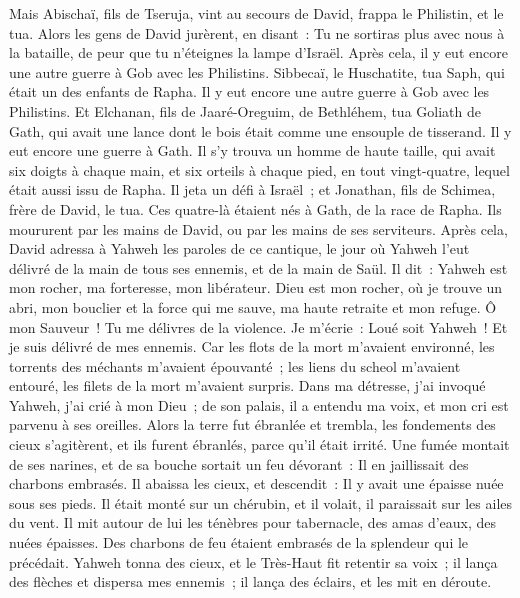 \begin{multicols}{2}
Mais Abischaï, fils de Tseruja, vint au secours de David, frappa le Philistin, et le tua. Alors les gens de David jurèrent, en disant~: Tu ne sortiras plus avec nous à la bataille, de peur que tu n'éteignes la lampe d'Israël.
Après cela, il y eut encore une autre guerre à Gob avec les Philistins. Sibbecaï, le Huschatite, tua Saph, qui était un des enfants de Rapha.
Il y eut encore une autre guerre à Gob avec les Philistins. Et Elchanan, fils de Jaaré-Oreguim, de Bethléhem, tua Goliath de Gath, qui avait une lance dont le bois était comme une ensouple de tisserand.
Il y eut encore une guerre à Gath. Il s'y trouva un homme de haute taille, qui avait six doigts à chaque main, et six orteils à chaque pied, en tout vingt-quatre, lequel était aussi issu de Rapha.
Il jeta un défi à Israël~; et Jonathan, fils de Schimea, frère de David, le tua.
Ces quatre-là étaient nés à Gath, de la race de Rapha. Ils moururent par les mains de David, ou par les mains de ses serviteurs.
\VerseOne{}Après cela, David adressa à Yahweh les paroles de ce cantique, le jour où Yahweh l'eut délivré de la main de tous ses ennemis, et de la main de Saül.
Il dit~: Yahweh est mon rocher, ma forteresse, mon libérateur.
Dieu est mon rocher, où je trouve un abri, mon bouclier et la force qui me sauve, ma haute retraite et mon refuge. Ô mon Sauveur~! Tu me délivres de la violence.
Je m'écrie~: Loué soit Yahweh~! Et je suis délivré de mes ennemis.
Car les flots de la mort m'avaient environné, les torrents des méchants m'avaient épouvanté~;
les liens du scheol m'avaient entouré, les filets de la mort m'avaient surpris.
Dans ma détresse, j'ai invoqué Yahweh, j'ai crié à mon Dieu~; de son palais, il a entendu ma voix, et mon cri est parvenu à ses oreilles.
Alors la terre fut ébranlée et trembla, les fondements des cieux s'agitèrent, et ils furent ébranlés, parce qu'il était irrité.
Une fumée montait de ses narines, et de sa bouche sortait un feu dévorant~: Il en jaillissait des charbons embrasés.
Il abaissa les cieux, et descendit~: Il y avait une épaisse nuée sous ses pieds.
Il était monté sur un chérubin, et il volait, il paraissait sur les ailes du vent.
Il mit autour de lui les ténèbres pour tabernacle, des amas d'eaux, des nuées épaisses.
Des charbons de feu étaient embrasés de la splendeur qui le précédait.
Yahweh tonna des cieux, et le Très-Haut fit retentir sa voix~;
il lança des flèches et dispersa mes ennemis~; il lança des éclairs, et les mit en déroute.

\end{multicols}
